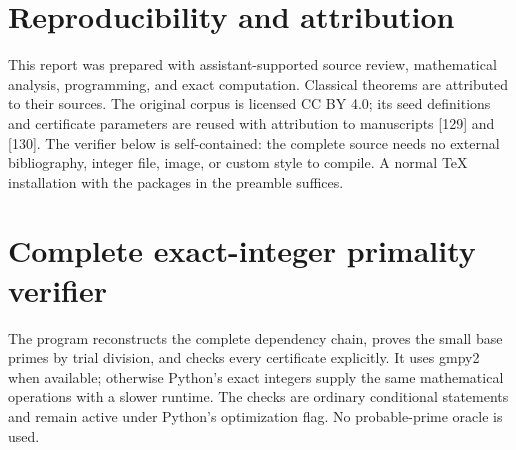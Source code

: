 \documentclass[11pt,a4paper]{article}
\theoremstyle{definition}\newtheorem{definition}[theorem]{Definition}
\theoremstyle{remark}\newtheorem{remark}[theorem]{Remark}
\begin{document}
\section*{Reproducibility and attribution}
This report was prepared with assistant-supported source review,
mathematical analysis, programming, and exact computation. Classical
theorems are attributed to their sources. The original corpus is licensed
CC BY 4.0; its seed definitions and certificate parameters are reused with
attribution to manuscripts [129] and [130]. The verifier below is
self-contained: the complete source needs no external bibliography,
integer file, image, or custom style to compile. A normal TeX installation
with the packages in the preamble suffices.

\appendix
\section{Complete exact-integer primality verifier}\label{app:verifier}
The program reconstructs the complete dependency chain, proves the small
base primes by trial division, and checks every certificate explicitly.
It uses gmpy2 when available; otherwise Python's exact integers supply the
same mathematical operations with a slower runtime. The checks are
ordinary conditional statements and remain active under Python's
optimization flag. No probable-prime oracle is used.
\end{document}
